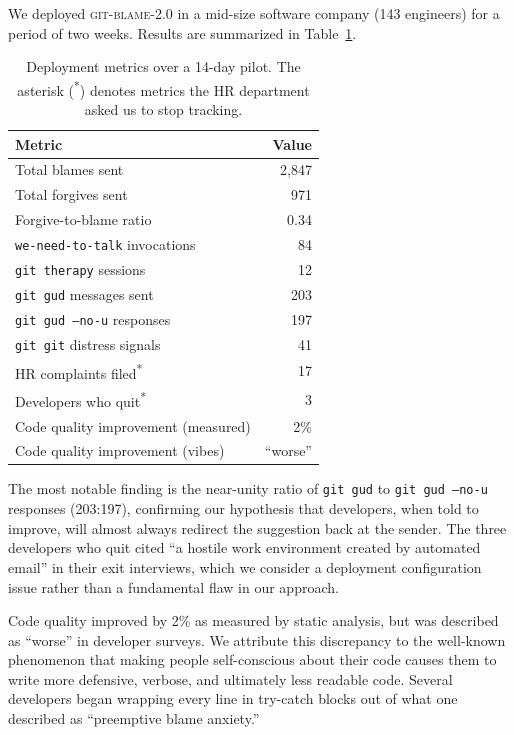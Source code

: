 \documentclass{sigtbd}
\begin{document}
We deployed \textsc{git-blame-2.0} in a mid-size software company (143 engineers) for a period of two weeks. Results are summarized in Table~\ref{tab:results}.

\begin{table}[h]
\centering
\caption{Deployment metrics over a 14-day pilot. The asterisk (\textsuperscript{*}) denotes metrics the HR department asked us to stop tracking.}
\label{tab:results}
\small
\begin{tabular}{@{}lr@{}}
\toprule
\textbf{Metric} & \textbf{Value} \\
\midrule
Total blames sent & 2,847 \\
Total forgives sent & 971 \\
Forgive-to-blame ratio & 0.34 \\
\texttt{we-need-to-talk} invocations & 84 \\
\texttt{git therapy} sessions & 12 \\
\texttt{git gud} messages sent & 203 \\
\texttt{git gud --no-u} responses & 197 \\
\texttt{git git} distress signals & 41 \\
HR complaints filed\textsuperscript{*} & 17 \\
Developers who quit\textsuperscript{*} & 3 \\
Code quality improvement (measured) & 2\% \\
Code quality improvement (vibes) & ``worse'' \\
\bottomrule
\end{tabular}
\end{table}

The most notable finding is the near-unity ratio of \texttt{git gud} to \texttt{git gud --no-u} responses (203:197), confirming our hypothesis that developers, when told to improve, will almost always redirect the suggestion back at the sender. The three developers who quit cited ``a hostile work environment created by automated email'' in their exit interviews, which we consider a deployment configuration issue rather than a fundamental flaw in our approach.

Code quality improved by 2\% as measured by static analysis, but was described as ``worse'' in developer surveys. We attribute this discrepancy to the well-known phenomenon that making people self-conscious about their code causes them to write more defensive, verbose, and ultimately less readable code. Several developers began wrapping every line in try-catch blocks out of what one described as ``preemptive blame anxiety.''
\end{document}
